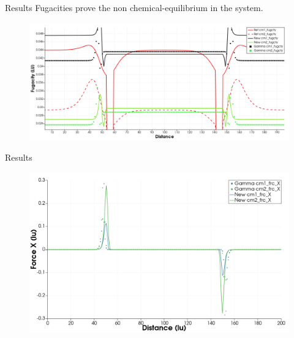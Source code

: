 \documentclass[8pt]{beamer}
\begin{document}
	\begin{frame}{Results}
		Fugacities prove the non chemical-equilibrium in the system.
		\begin{figure}
			\centering
			\includegraphics[width=\textwidth]{pics/1dnewForce/fugacity.png}
		\end{figure}
	\end{frame}

	\begin{frame}{Results}
		\begin{figure}
			\centering
			\includegraphics[width=\textwidth]{pics/1dnewForce/forceX.png}
		\end{figure}
	\end{frame}

	
\end{document}
